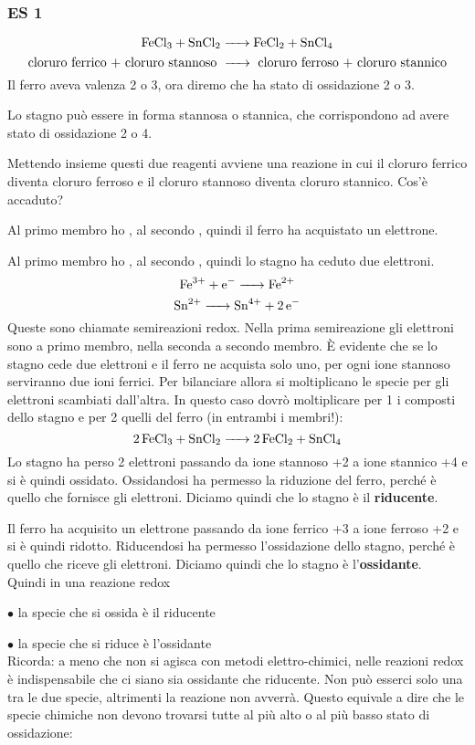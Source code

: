 \subsubsection{\textbf{ES 1}}
$$\ce{FeCl_3 + SnCl_2 -> FeCl_2 + SnCl_4}$$
$$\text{cloruro ferrico + cloruro stannoso \ce{->} cloruro ferroso + cloruro stannico}$$
Il ferro aveva valenza 2 o 3, ora diremo che ha stato di ossidazione 2 o 3.

Lo stagno può essere in forma stannosa o stannica, che corrispondono ad avere stato di ossidazione 2 o 4.

Mettendo insieme questi due reagenti avviene una reazione in cui il cloruro ferrico diventa cloruro ferroso e il cloruro stannoso diventa cloruro stannico. Cos'è accaduto?

Al primo membro ho , al secondo , quindi il ferro ha acquistato un elettrone.

Al primo membro ho , al secondo , quindi lo stagno ha ceduto due elettroni.
$$\ce{Fe^{3+} + e^- -> Fe^{2+}}$$
$$\ce{Sn^{2+} -> Sn^{4+} + 2 e^-}$$
Queste sono chiamate semireazioni redox.
Nella prima semireazione gli elettroni sono a primo membro, nella seconda a secondo membro.
È evidente che se lo stagno cede due elettroni e il ferro ne acquista solo uno, per ogni ione stannoso serviranno due ioni ferrici.
Per bilanciare allora si moltiplicano le specie per gli elettroni scambiati dall'altra.
In questo caso dovrò moltiplicare per 1 i composti dello stagno e per 2 quelli del ferro (in entrambi i membri!):
$$\ce{2 FeCl_3 + SnCl_2 -> 2 FeCl_2 + SnCl_4}$$
Lo stagno ha perso 2 elettroni passando da ione stannoso +2 a ione stannico +4 e si è quindi ossidato. Ossidandosi ha permesso la riduzione del ferro, perché è quello che fornisce gli elettroni. Diciamo quindi che lo stagno è il \textbf{riducente}.

Il ferro ha acquisito un elettrone passando da ione ferrico +3 a ione ferroso +2 e si è quindi ridotto. Riducendosi ha permesso l'ossidazione dello stagno, perché è quello che riceve gli elettroni. Diciamo quindi che lo stagno è l'\textbf{ossidante}.\\

Quindi in una reazione redox

$\bullet$ la specie che si ossida è il riducente

$\bullet$ la specie che si riduce è l'ossidante\\

Ricorda: a meno che non si agisca con metodi elettro-chimici, nelle reazioni redox è indispensabile che ci siano sia ossidante che riducente. Non può esserci solo una tra le due specie, altrimenti la reazione non avverrà. Questo equivale a dire che le specie chimiche non devono trovarsi tutte al più alto o al più basso stato di ossidazione:


